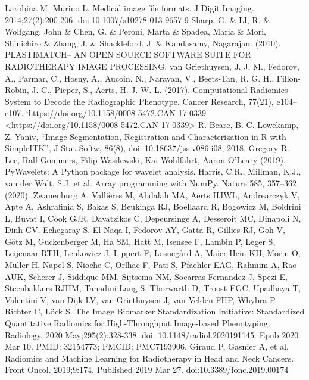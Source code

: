 \documentclass[final,1p,times,twocolumn]{elsarticle}
\begin{document}
\begin{thebibliography}{00}
 Larobina M, Murino L. Medical image file formats. J Digit Imaging. 2014;27(2):200-206. doi:10.1007/s10278-013-9657-9
 Sharp, G. \& LI, R. \& Wolfgang, John \& Chen, G. \& Peroni, Marta \& Spadea, Maria \& Mori, Shinichiro \& Zhang, J. \& Shackleford, J. \& Kandasamy, Nagarajan. (2010). PLASTIMATCH– AN OPEN SOURCE SOFTWARE SUITE FOR RADIOTHERAPY IMAGE PROCESSING.
  van Griethuysen, J. J. M., Fedorov, A., Parmar, C., Hosny, A., Aucoin, N., Narayan, V., Beets-Tan, R. G. H., Fillon-Robin, J. C., Pieper, S., Aerts, H. J. W. L. (2017). Computational Radiomics System to Decode the Radiographic Phenotype. Cancer Research, 77(21), e104–e107. `https://doi.org/10.1158/0008-5472.CAN-17-0339 <https://doi.org/10.1158/0008-5472.CAN-17-0339>
 R. Beare, B. C. Lowekamp, Z. Yaniv, “Image Segmentation, Registration and Characterization in R with SimpleITK”, J Stat Softw, 86(8), doi: 10.18637/jss.v086.i08, 2018.
 Gregory R. Lee, Ralf Gommers, Filip Wasilewski, Kai Wohlfahrt, Aaron O'Leary (2019). PyWavelets: A Python package for wavelet analysis.
 Harris, C.R., Millman, K.J., van der Walt, S.J. et al. Array programming with NumPy. Nature 585, 357–362 (2020).
 Zwanenburg A, Vallières M, Abdalah MA, Aerts HJWL, Andrearczyk V, Apte A, Ashrafinia S, Bakas S, Beukinga RJ, Boellaard R, Bogowicz M, Boldrini L, Buvat I, Cook GJR, Davatzikos C, Depeursinge A, Desseroit MC, Dinapoli N, Dinh CV, Echegaray S, El Naqa I, Fedorov AY, Gatta R, Gillies RJ, Goh V, Götz M, Guckenberger M, Ha SM, Hatt M, Isensee F, Lambin P, Leger S, Leijenaar RTH, Lenkowicz J, Lippert F, Losnegård A, Maier-Hein KH, Morin O, Müller H, Napel S, Nioche C, Orlhac F, Pati S, Pfaehler EAG, Rahmim A, Rao AUK, Scherer J, Siddique MM, Sijtsema NM, Socarras Fernandez J, Spezi E, Steenbakkers RJHM, Tanadini-Lang S, Thorwarth D, Troost EGC, Upadhaya T, Valentini V, van Dijk LV, van Griethuysen J, van Velden FHP, Whybra P, Richter C, Löck S. The Image Biomarker Standardization Initiative: Standardized Quantitative Radiomics for High-Throughput Image-based Phenotyping. Radiology. 2020 May;295(2):328-338. doi: 10.1148/radiol.2020191145. Epub 2020 Mar 10. PMID: 32154773; PMCID: PMC7193906.
 Giraud P, Gasnier A, et al. Radiomics and Machine Learning for Radiotherapy in Head and Neck Cancers. Front Oncol. 2019;9:174. Published 2019 Mar 27. doi:10.3389/fonc.2019.00174
\end{thebibliography}
\end{document}
